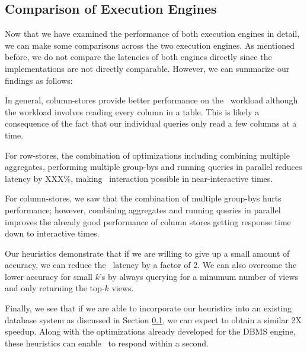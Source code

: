 \subsection{Comparison of Execution Engines}

Now that we have examined the performance of both execution engines in detail,
we can make some comparisons across the two execution engines.
As mentioned before, we do not compare the latencies of both engines directly
since the implementations are not directly comparable.
However, we can summarize our findings as follows:
\squishlist
\item In general, column-stores provide better performance on the \VizRecDB\
workload although the workload involves reading every column in a table. This is
likely a consequence of the fact that our individual queries only read a few
columns at a time.
\item For row-stores, the combination of optimizations including combining
multiple aggregates, performing multiple group-bys and running queries in
parallel reduces latency by XXX\%, making \VizRecDB\ interaction possible in
near-interactive times.
\item For column-stores, we saw that the combination of multiple group-bys hurts
performance; however, combining aggregates and running queries in parallel
improves the already good performance of column stores getting response time
down to interactive times.
\item Our heuristics demonstrate that if we are willing to give up a small
amount of accuracy, we can reduce the \VizRecDB\ latency by a factor of 2. We
can also overcome the lower accuracy for small $k$'s by always querying for a
minumum number of views and only returning the top-$k$ views.
\item Finally, we see that if we are able to incorporate our heuristics into an
existing database system as discussed in Section \ref{}, we can expect to
obtain a similar 2X speedup. Along with the optimizations already developed for
the DBMS engine, these heuristics can enable \VizRecDB\ to respond within a
second.
\squishend







